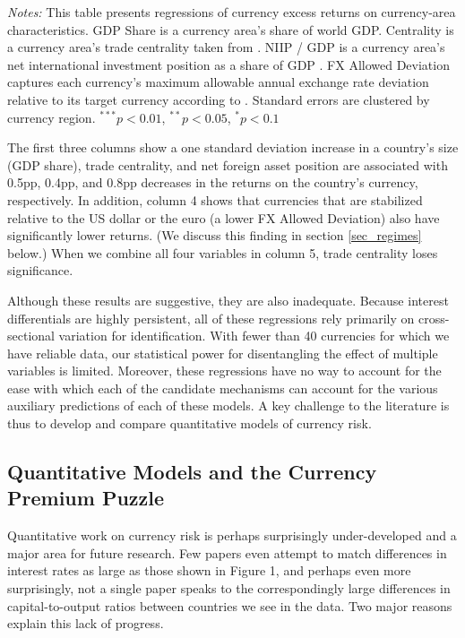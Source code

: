 \documentclass{ar-1col}
\begin{document}
\begin{table}[htp]
\begin{minipage}[htp!]{\textwidth}
\scriptsize
\emph{Notes:} This table presents regressions of currency excess returns on currency-area characteristics. GDP Share is a currency area's share of world GDP. Centrality is a currency area's trade centrality taken from \citet{Richmond2019}. NIIP / GDP is a currency area's net international investment position as a share of GDP \citep{DellaCorteetal2016}. FX Allowed Deviation captures each currency's maximum allowable annual exchange rate deviation relative to its target currency according to \citet{ilzetzki2018exchange}. Standard errors are clustered by currency region. $^{***}p<0.01$, $^{**}p<0.05$, $^*p<0.1$
\end{minipage}
\end{table}

The first three columns show a one standard deviation increase in a country's size (GDP share), trade centrality, and net foreign asset position are associated with 0.5pp, 0.4pp, and 0.8pp decreases in the returns on the country's currency, respectively. In addition, column 4 shows that currencies that are stabilized relative to the US dollar or the euro (a lower FX Allowed Deviation) also have significantly lower returns. (We discuss this finding in section \ref{sec_regimes} below.) When we combine all four variables in column 5, trade centrality loses significance.

Although these results are suggestive, they are also inadequate. Because interest differentials are highly persistent, all of these regressions rely primarily on cross-sectional variation for identification.  With fewer than 40 currencies for which we have reliable data, our statistical power for disentangling the effect of multiple variables is limited. Moreover, these regressions have no way to account for the ease with which each of the candidate mechanisms can account for the various auxiliary predictions of each of these models. A key challenge to the literature is thus to develop and compare quantitative models of currency risk.


\subsection{Quantitative Models and the Currency Premium Puzzle \label{section:cpp}}

Quantitative work on currency risk is perhaps surprisingly under-developed and a major area for future research. Few papers even attempt to match differences in interest rates as large as those shown in Figure 1, and perhaps even more surprisingly, not a single paper speaks to the correspondingly large differences in capital-to-output ratios between countries we see in the data. Two major reasons explain this lack of progress.
\end{document}
